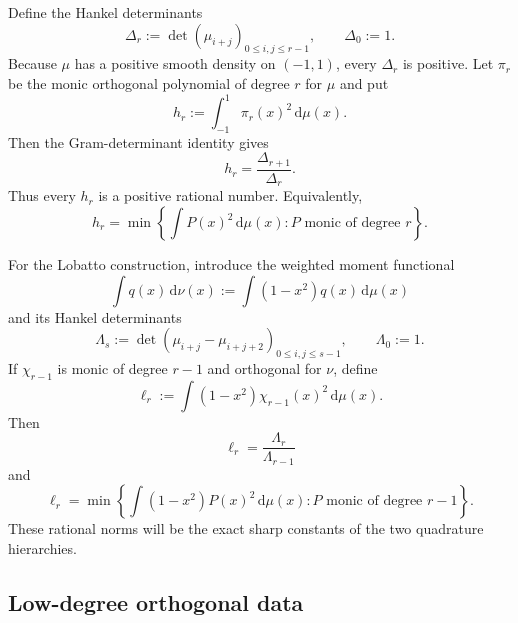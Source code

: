 \documentclass[11pt]{article}
\numberwithin{equation}{section}
\theoremstyle{definition}
\theoremstyle{remark}
\newcommand{\dd}{\,\mathrm d}
\begin{document}
Define the Hankel determinants
\begin{equation}
 \Delta_r:=\det(\mu_{i+j})_{0\le i,j\le r-1},
 \qquad \Delta_0:=1.
 \label{eq:Hankel}
\end{equation}
Because $\mu$ has a positive smooth density on $(-1,1)$, every $\Delta_r$ is positive.  Let $\pi_r$ be the monic orthogonal polynomial of degree $r$ for $\mu$ and put
\begin{equation}
 h_r:=\int_{-1}^{1}\pi_r(x)^2\dd\mu(x).
 \label{eq:hr}
\end{equation}
Then the Gram-determinant identity gives
\begin{equation}
 \boxed{h_r=\frac{\Delta_{r+1}}{\Delta_r}.}
 \label{eq:hr-determinant}
\end{equation}
Thus every $h_r$ is a positive rational number.  Equivalently,
\begin{equation}
 h_r=\min\left\{\int P(x)^2\dd\mu(x):P\text{ monic of degree }r\right\}.
 \label{eq:hr-minimizer}
\end{equation}

For the Lobatto construction, introduce the weighted moment functional
\begin{equation}
 \int q(x)\dd\nu(x):=\int(1-x^2)q(x)\dd\mu(x)
 \label{eq:nu-weighted}
\end{equation}
and its Hankel determinants
\begin{equation}
 \Lambda_s:=\det(\mu_{i+j}-\mu_{i+j+2})_{0\le i,j\le s-1},
 \qquad \Lambda_0:=1.
 \label{eq:Lambda}
\end{equation}
If $\chi_{r-1}$ is monic of degree $r-1$ and orthogonal for $\nu$, define
\begin{equation}
 \ell_r:=\int(1-x^2)\chi_{r-1}(x)^2\dd\mu(x).
 \label{eq:ellr}
\end{equation}
Then
\begin{equation}
 \boxed{\ell_r=\frac{\Lambda_r}{\Lambda_{r-1}}}
 \label{eq:ellr-determinant}
\end{equation}
and
\begin{equation}
 \ell_r=\min\left\{\int(1-x^2)P(x)^2\dd\mu(x):P\text{ monic of degree }r-1\right\}.
 \label{eq:ellr-minimizer}
\end{equation}
These rational norms will be the exact sharp constants of the two quadrature hierarchies.

\subsection{Low-degree orthogonal data}
\end{document}
